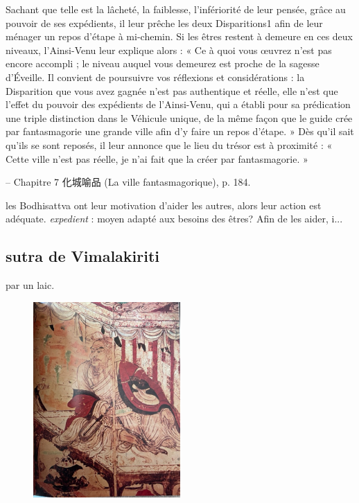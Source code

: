 \begin{singlequote}
Sachant que telle est la lâcheté, la faiblesse, l’infériorité de leur pensée, grâce au pouvoir de ses expédients, il leur prêche les deux Disparitions1 afin de leur ménager un repos d’étape à mi-chemin. Si les êtres restent à demeure en ces deux niveaux, l’Ainsi-Venu leur explique alors :
« Ce à quoi vous œuvrez n’est pas encore accompli ; le niveau auquel vous demeurez est proche de la sagesse d’Éveille. Il convient de poursuivre vos réflexions et considérations : la Disparition que vous avez gagnée n’est pas authentique et réelle, elle n’est que l’effet du pouvoir des expédients de l’Ainsi-Venu, qui a établi pour sa prédication une triple distinction dans le Véhicule unique, de la même façon que le guide crée par fantasmagorie une grande ville afin d’y faire un repos d’étape. » Dès qu’il sait qu’ils se sont reposés, il leur annonce que le lieu du trésor est à proximité : « Cette ville n’est pas réelle, je n’ai fait que la créer par fantasmagorie. »

-- Chapitre 7 化城喻品 (La ville fantasmagorique), p. 184.
\end{singlequote}

\begin{Ex}
    les Bodhisattva ont leur motivation d'aider les autres, alors leur action est adéquate. \textit{expedient} : moyen adapté aux besoins des êtres? Afin de les aider, i...
\end{Ex}

\subsection{sutra de Vimalakiriti} par un laic.
\begin{figure}
    \centering
        \includegraphics[width=0.5\textwidth]{ConfucianismeTaoismeBouddhismeChinois/BouddhaMahayana.jpg}

    \label{fig:enter-label}
\end{figure}


